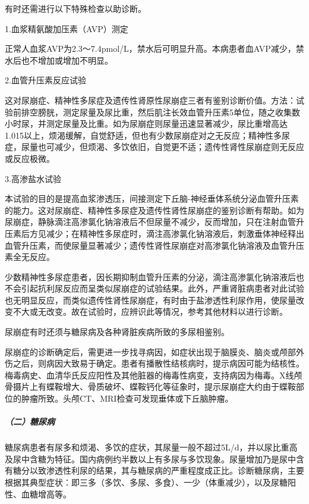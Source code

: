有时还需进行以下特殊检查以助诊断。

\hypertarget{text00273.htmlux5cux23CHP35-2-2-2-1-1-1}{}
1.血浆精氨酸加压素（AVP）测定

正常人血浆AVP为2.3～7.4pmol/L，禁水后可明显升高。本病患者血AVP减少，禁水后也不增加或增加不明显。

\hypertarget{text00273.htmlux5cux23CHP35-2-2-2-1-1-2}{}
2.血管升压素反应试验

这对尿崩症、精神性多尿症及遗传性肾原性尿崩症三者有鉴别诊断价值。方法：试验前排空膀胱，测定尿量及尿比重，然后肌注长效血管升压素5单位，随之收集数小时尿，并测定尿量及比重。如为尿崩症则尿量迅速显著减少，尿比重增高达1.015以上，烦渴缓解，自觉舒适，但也有少数尿崩症对之无反应；精神性多尿症，尿量也可减少，但烦渴、多饮依旧，自觉更不适；遗传性肾性尿崩症则无反应或反应极微。

\hypertarget{text00273.htmlux5cux23CHP35-2-2-2-1-1-3}{}
3.高渗盐水试验

本试验的目的是提高血浆渗透压，间接测定下丘脑-神经垂体系统分泌血管升压素的能力。这对尿崩症、精神性多尿症及遗传性肾性尿崩症的鉴别诊断有帮助。如为尿崩症，静脉滴注高渗氯化钠溶液后不但尿量不减少，反而增加，只在注射血管升压素后方见减少；在精神性多尿症时，滴注高渗氯化钠溶液后，刺激垂体神经释出血管升压素，而使尿量显著减少；遗传性肾性尿崩症对高渗氯化钠溶液及血管升压素全无反应。

少数精神性多尿症患者，因长期抑制血管升压素的分泌，滴注高渗氯化钠溶液后也不会引起抗利尿反应而呈类似尿崩症的试验结果。此外，严重肾脏病患者对此试验也无明显反应，而类似遗传性肾性尿崩症，有时由于盐渗透性利尿作用，使尿量改变不大或无改变。故在试验时，应辨识此等情况，参考其他材料以进行诊断。

尿崩症有时还须与糖尿病及各种肾脏疾病所致的多尿相鉴别。

尿崩症的诊断确定后，需更进一步找寻病因，如症状出现于脑膜炎、脑炎或颅部外伤之后，则病因大致易于确定。患者有播散性结核病时，提示病因可能为结核性。梅毒病史、血清华氏反应阳性及其他脏器的梅毒性病变，支持病因为梅毒。X线颅骨摄片上有蝶鞍增大、骨质破坏、蝶鞍钙化等征象时，提示尿崩症大约由于蝶鞍部位的肿瘤所致。头颅CT、MRI检查可发现垂体或下丘脑肿瘤。

\subparagraph{（二）糖尿病}

糖尿病患者有尿多和烦渴、多饮的症状，其尿量一般不超过5L/d，并以尿比重高及尿中含糖为特征。国内病例约半数以上有多尿与多饮现象。尿量增加乃是尿中含有糖分以致渗透性利尿的结果，其与糖尿病的严重程度成正比。诊断糖尿病，主要根据其典型症状：即三多（多饮、多尿、多食）、一少（体重减少），以及尿糖阳性、血糖增高等。

